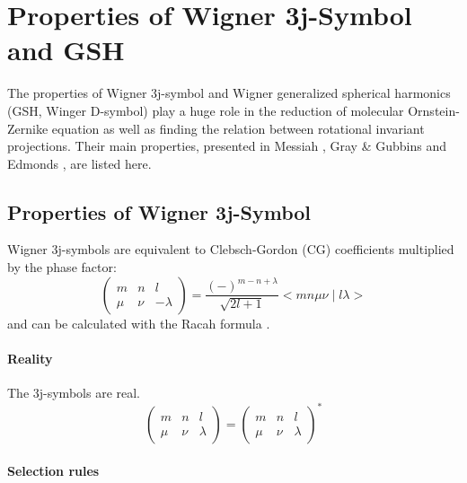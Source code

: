 
\chapter{Properties of Wigner 3j-Symbol and GSH \label{chpt:symmetry}}

The properties of Wigner 3j-symbol and Wigner generalized spherical
harmonics (GSH, Winger D-symbol) play a huge role in the reduction
of molecular Ornstein-Zernike equation as well as finding the relation
between rotational invariant projections. Their main properties, presented
in Messiah \citep{Messiah}, Gray \& Gubbins \citep{Gray-Gubbins}
and Edmonds \citep{Edmonds}, are listed here.


\section{Properties of Wigner 3j-Symbol}

Wigner 3j-symbols are equivalent to Clebsch-Gordon (CG) coefficients
multiplied by the phase factor:
\begin{equation}
\left(\begin{array}{ccc}
m & n & l\\
\mu & \nu & -\lambda
\end{array}\right)=\frac{\left(-\right)^{m-n+\lambda}}{\sqrt{2l+1}}<mn\mu\nu\mid l\lambda>
\end{equation}
and can be calculated with the Racah formula \citep{Messiah}.


\subsubsection*{Reality}

The 3j-symbols are real.
\begin{equation}
\left(\begin{array}{ccc}
m & n & l\\
\mu & \nu & \lambda
\end{array}\right)=\left(\begin{array}{ccc}
m & n & l\\
\mu & \nu & \lambda
\end{array}\right)^{*}
\end{equation}



\subsubsection*{Selection rules}


